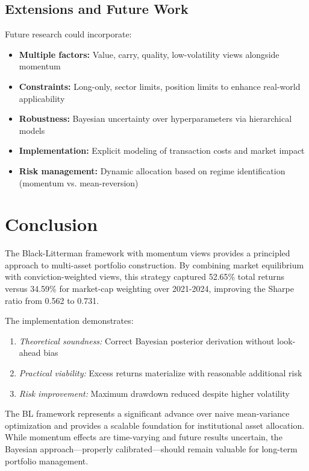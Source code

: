 \documentclass[12pt,a4paper]{article}
\begin{document}
\subsection{Extensions and Future Work}

Future research could incorporate:
\begin{itemize}
\item \textbf{Multiple factors:} Value, carry, quality, low-volatility views alongside momentum
\item \textbf{Constraints:} Long-only, sector limits, position limits to enhance real-world applicability
\item \textbf{Robustness:} Bayesian uncertainty over hyperparameters via hierarchical models
\item \textbf{Implementation:} Explicit modeling of transaction costs and market impact
\item \textbf{Risk management:} Dynamic allocation based on regime identification (momentum vs. mean-reversion)
\end{itemize}

\section{Conclusion}

The Black-Litterman framework with momentum views provides a principled approach to multi-asset portfolio construction. By combining market equilibrium with conviction-weighted views, this strategy captured 52.65\% total returns versus 34.59\% for market-cap weighting over 2021-2024, improving the Sharpe ratio from 0.562 to 0.731.

The implementation demonstrates:
\begin{enumerate}
\item \textit{Theoretical soundness:} Correct Bayesian posterior derivation without look-ahead bias
\item \textit{Practical viability:} Excess returns materialize with reasonable additional risk
\item \textit{Risk improvement:} Maximum drawdown reduced despite higher volatility
\end{enumerate}

The BL framework represents a significant advance over naive mean-variance optimization and provides a scalable foundation for institutional asset allocation. While momentum effects are time-varying and future results uncertain, the Bayesian approach—properly calibrated—should remain valuable for long-term portfolio management.
\end{document}
